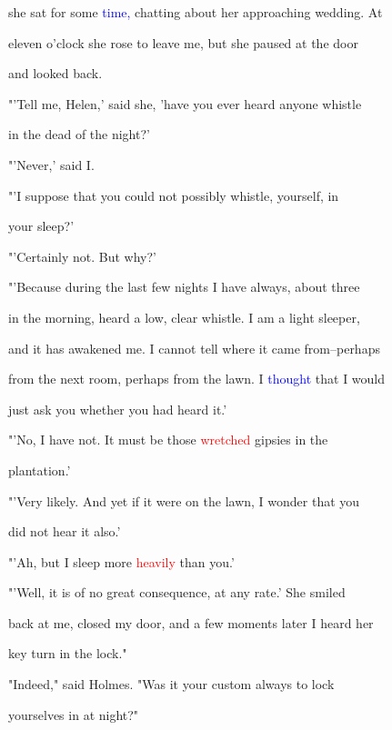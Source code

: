  she sat for some \textcolor{blue}{time,} chatting about her approaching wedding. At

 eleven o'clock she rose to \textcolor{BurntOrange}{leave} me, but she paused at the door

 and looked back.



 "'Tell me, Helen,' said she, 'have you ever heard anyone whistle

 in the dead of the night?'



 "'Never,' said I.



 "'I suppose that you could not possibly whistle, yourself, in

 your sleep?'



 "'Certainly not. But why?'



 "'Because during the last few nights I have always, about three

 in the morning, heard a low, clear whistle. I am a light sleeper,

 and it has awakened me. I cannot tell where it came from--perhaps

 from the next room, perhaps from the lawn. I \textcolor{blue}{thought} that I would

 just ask you whether you had heard it.'



 "'No, I have not. It must be those \textcolor{red}{wretched} gipsies in the

 plantation.'



 "'Very likely. And yet if it were on the lawn, I wonder that you

 did not hear it also.'



 "'Ah, but I sleep more \textcolor{red}{heavily} than you.'



 "'Well, it is of no great consequence, at any rate.' She \textcolor{BurntOrange}{smiled}

 back at me, closed my door, and a few moments later I heard her

 key turn in the lock."



 "Indeed," said Holmes. "Was it your custom always to lock

 yourselves in at night?"



